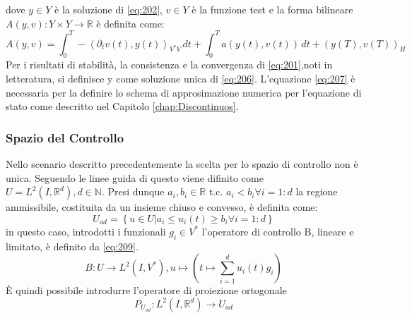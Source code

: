 dove $y{\in}Y$ è la soluzione di \ref{eq:202}, $v{\in}Y$ è la funzione test e la forma bilineare $A(y,v): Y{\times}Y\rightarrow\mathbb{R}$ è definita come:
\begin{equation}
 A(y,v) = \int_{0}^{T} -\left \langle {\partial_{t}}v(t),y(t) \right \rangle_{V^*V} \, dt + \int_{0}^{T} a(y(t),v(t)) \, dt + (y(T),v(T))_H
\label{eq:207}
\end{equation}
Per i risultati di stabilità, la consistenza e la convergenza di \ref{eq:201},noti in letteratura, si definisce y come soluzione unica di \ref{eq:206}. L'equazione \ref{eq:207} è necessaria per la definire  lo schema di approsimazione numerica per l'equazione di stato come descritto nel Capitolo \ref{chap:Discontinuos}.

\subsubsection{Spazio del Controllo}
Nello scenario descritto precedentemente la scelta per lo spazio di controllo non è unica. Seguendo le linee guida di \cite{MAIN} questo viene difinito come $U = L^2(I,\mathbb{R}^d), d \in \mathbb{N}$. Presi dunque $a_i, b_i \in \mathbb{R}$ t.c. $a_i<b_i {\forall}i=1:d$ la regione ammissibile, costituita da un insieme chiuso e convesso, è definita come:
\begin{equation}
U_{ad} = \left\{ u \in U | a_i \leq u_i(t) \geq b_i {\forall}i=1:d  \right\}
\label{eq:208}
\end{equation}
in questo caso, introdotti i funzionali $g_i \in V^*$ l'operatore di controllo B, lineare e limitato, è definito da \ref{eq:209}.
\begin{equation}
B : U \rightarrow L^2(I,V^*), u\mapsto \left( t\mapsto\sum_{i=1}^d u_i(t)g_i \right)
\label{eq:209}
\end{equation}
\MakeUppercase{è} quindi possibile introdurre l'operatore di proiezione ortogonale 
\begin{equation}
P_{U_{ad}} : L^2(I,\mathbb{R}^d)\rightarrow U_{ad}
\label{eq:210}
\end{equation}

